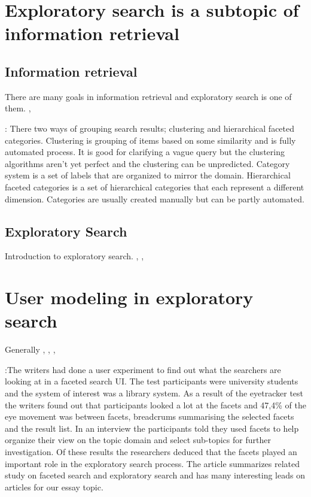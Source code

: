 \documentclass{sigchi}
\begin{document}
\section {Exploratory search is a subtopic of information retrieval}

\subsection{Information retrieval}
There are many goals in information retrieval and exploratory search is one of them.
\cite{hearst02}, \cite{kuhlt91}

\cite{hearst06}: There two ways of grouping search results; clustering and hierarchical faceted categories. Clustering is grouping of items based on some similarity and is fully automated process. It is good for clarifying a vague query but the clustering algorithms aren't yet perfect and the clustering can be unpredicted. Category system is a set of labels that are organized to mirror the domain. Hierarchical faceted categories is a set of hierarchical categories that each represent a different dimension. Categories are usually created manually but can be partly automated. 

\subsection{Exploratory Search}
Introduction to exploratory search.
\cite{march06}, \cite{white09}, \cite{tvaro11}



\section{User modeling in exploratory search}
Generally
\cite{oconnor10}, \cite{sugi04}, \cite{white07}, \cite{kules09}

\cite{kules09}:The writers had done a user experiment to find out what  the searchers are  looking at in a faceted search UI. The test participants were  university students and the system of interest was a library system. As a result  of the eyetracker test the writers found out that participants looked a lot at the facets and  47,4\% of the  eye movement  was between facets, breadcrums summarising the selected facets and the result list. In an interview the participants told they used facets to help organize their view on the topic domain and select sub-topics for further investigation. Of these results the researchers deduced that the facets played an important role in the exploratory search process. 
The article summarizes related study on faceted search and exploratory search and has many interesting leads on articles for our essay topic.
\end{document}

